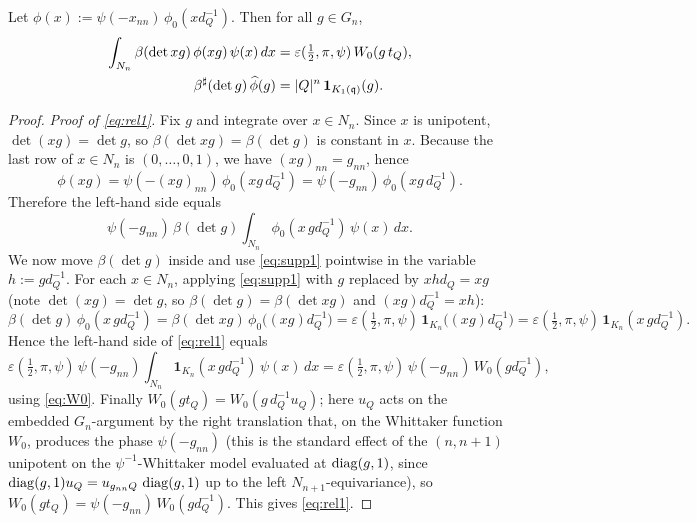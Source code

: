 \begin{qtwolemma}\label{lem:relations}
Let $\phi(x):=\psi(-x_{nn})\,\phi_0(x d_Q^{-1})$. Then for all $g\in G_n$,
\begin{align}
\int_{N_n}\beta(\det xg)\,\phi(xg)\,\psi(x)\,dx
&=\varepsilon(\tfrac12,\pi,\psi)\,W_0(g\,t_Q),\label{eq:rel1}\\
\beta^\sharp(\det g)\,\widehat\phi(g)&=|Q|^n\,\mathbf 1_{K_1(\mathfrak{q})}(g).\label{eq:rel2}
\end{align}
\end{qtwolemma}

\begin{proof}
\emph{Proof of \eqref{eq:rel1}.} Fix $g$ and integrate over $x\in N_n$. Since $x$ is
unipotent, $\det(xg)=\det g$, so $\beta(\det xg)=\beta(\det g)$ is constant in $x$.
Because the last row of $x\in N_n$ is $(0,\dots,0,1)$, we have $(xg)_{nn}=g_{nn}$, hence
\[
\phi(xg)=\psi(-(xg)_{nn})\,\phi_0(xg\,d_Q^{-1})=\psi(-g_{nn})\,\phi_0(xg\,d_Q^{-1}).
\]
Therefore the left-hand side equals
\[
\psi(-g_{nn})\,\beta(\det g)\int_{N_n}\phi_0(x\,g d_Q^{-1})\,\psi(x)\,dx .
\]
We now move $\beta(\det g)$ inside and use \eqref{eq:supp1} pointwise in the variable
$h:=g d_Q^{-1}$. For each $x\in N_n$, applying \eqref{eq:supp1} with $g$ replaced by $xh d_Q=xg$
(note $\det(xg)=\det g$, so $\beta(\det g)=\beta(\det xg)$ and $(xg)d_Q^{-1}=x h$):
\[
\beta(\det g)\,\phi_0(x\,g d_Q^{-1})=\beta(\det xg)\,\phi_0\big((xg)d_Q^{-1}\big)
=\varepsilon(\tfrac12,\pi,\psi)\,\mathbf 1_{K_n}\big((xg)d_Q^{-1}\big)
=\varepsilon(\tfrac12,\pi,\psi)\,\mathbf 1_{K_n}(x\,g d_Q^{-1}).
\]
Hence the left-hand side of \eqref{eq:rel1} equals
\[
\varepsilon(\tfrac12,\pi,\psi)\,\psi(-g_{nn})\int_{N_n}\mathbf 1_{K_n}(x\,g d_Q^{-1})\,\psi(x)\,dx
=\varepsilon(\tfrac12,\pi,\psi)\,\psi(-g_{nn})\,W_0(g d_Q^{-1}),
\]
using \eqref{eq:W0}. Finally $W_0(g t_Q)=W_0(g\,d_Q^{-1}u_Q)$; here $u_Q$ acts on the embedded
$G_n$-argument by the right translation that, on the Whittaker function $W_0$, produces the phase
$\psi(-g_{nn})$ (this is the standard effect of the $(n,n+1)$ unipotent on the $\psi^{-1}$-Whittaker
model evaluated at $\operatorname{diag}(g,1)$, since $\operatorname{diag}(g,1)u_Q=u_{g_{nn}Q}\,\operatorname{diag}(g,1)$ up to the
left $N_{n+1}$-equivariance), so $W_0(g t_Q)=\psi(-g_{nn})\,W_0(g d_Q^{-1})$. This gives
\eqref{eq:rel1}.


\end{proof}
